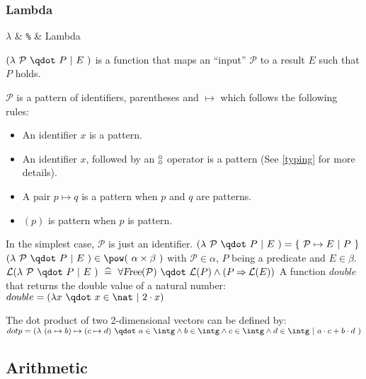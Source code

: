 \subsubsection{Lambda}
\label{lambda}
\newcommand{\lambdapattern}{\mathcal{P}}
\begin{rrnames}
  $\lambda$  & \texttt{\%}  & Lambda
\end{rrnames}
\begin{rodinrefentry}
  \rrdesc
    $(\lambda~\lambdapattern~\qdot~P~|~E~)$ is a function that maps an ``input'' $\lambdapattern$ to
    a result $E$ such that $P$ holds. 

    $\lambdapattern$ is a pattern of identifiers, parentheses and $\mapsto$ which follows the
    following rules:
    \begin{itemize}
    \item An identifier $x$ is a pattern.
    \item An identifier $x$, followed by an $\boftype$ operator is a pattern (See \ref{typing}
      for more details).
    \item A pair $p\mapsto q$ is a pattern when $p$ and $q$ are patterns.
    \item $(p)$ is pattern when $p$ is pattern.
    \end{itemize}
    In the simplest case, $\lambdapattern$ is just an identifier.
  \rrdef
    $(\lambda~\lambdapattern~\qdot~P~|~E~) = \{~\lambdapattern\mapsto E~|~P~\}$
  \rrtypes
    $(\lambda~\lambdapattern~\qdot~P~|~E~)\in\pow(~\alpha\cprod\beta~)$
    with $\lambdapattern\in\alpha$, $P$ being a predicate and $E\in\beta$.
  \rrwd
    $\wdl(\lambda~\lambdapattern~\qdot~P~|~E~)~\defi~
    \forall \freeids{\lambdapattern}~\qdot~\wdl(P)\land (P\limp \wdl(E))$
  \rrex
    A function $double$ that returns the double value of a natural number:\\
    $double = (\lambda x~\qdot~x\in\nat~|~2\cdot x)$

    The dot product of two 2-dimensional vectors can be defined by:\\
    $dotp = (\lambda~(a \mapsto b)\mapsto(c \mapsto d)~\qdot~a\in\intg\land  b\in\intg\land  c\in\intg\land  d\in\intg~|~a\cdot c+b\cdot d~)$
\end{rodinrefentry}



\subsection{Arithmetic}
\label{arithmetic}

